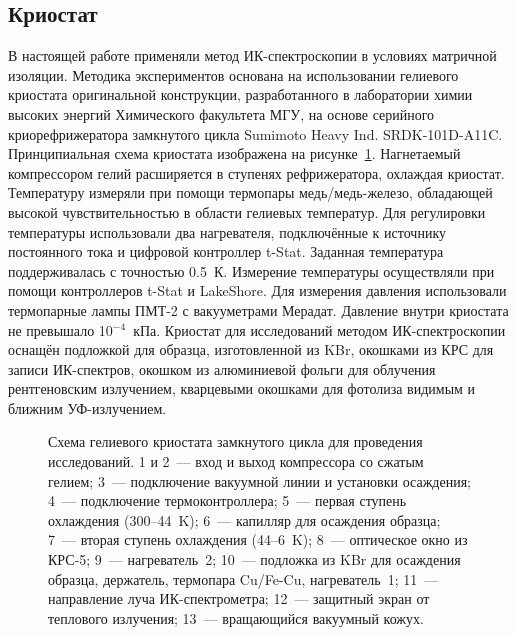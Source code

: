 \subsection{Криостат}
В настоящей работе применяли метод ИК-спектроскопии в условиях матричной изоляции. 
Методика экспериментов основана на использовании гелиевого криостата оригинальной конструкции, разработанного в лаборатории химии высоких энергий 
Химического факультета МГУ, на основе серийного криорефрижератора замкнутого цикла Sumimoto Heavy Ind. SRDK-101D-A11C. 
Принципиальная схема криостата изображена на рисунке~\ref{IR}.
Нагнетаемый компрессором гелий расширяется в ступенях рефрижератора, охлаждая криостат. 
Температуру измеряли при помощи термопары медь/медь-железо, обладающей высокой чувствительностью в области гелиевых температур. 
Для регулировки температуры использовали два нагревателя, подключённые к источнику постоянного тока и цифровой контроллер t-Stat. 
Заданная температура поддерживалась с точностью 0.5~К. Измерение температуры осуществляли при помощи контроллеров t-Stat и LakeShore. 
Для измерения давления использовали термопарные лампы ПМТ-2 с вакууметрами Мерадат. Давление внутри криостата не превышало 10$^{-4}$~кПа. 
Криостат для исследований методом ИК-спектроскопии оснащён подложкой для образца, изготовленной из KBr, окошками из КРС для записи ИК-спектров, 
окошком из алюминиевой фольги для облучения рентгеновским излучением, кварцевыми окошками для фотолиза видимым и ближним УФ-излучением.
\begin{figure}[H]
\caption{Схема гелиевого криостата замкнутого цикла для проведения исследований. 1 и 2~--- вход и выход компрессора со сжатым гелием; 3~--- подключение вакуумной линии и установки осаждения; 4~--- подключение термоконтроллера; 5~--- первая ступень охлаждения (300--44~K); 6~--- капилляр для осаждения образца; 7~--- вторая ступень охлаждения (44--6~K); 8~--- оптическое окно из КРС-5; 9~--- нагреватель~2; 10~--- подложка из KBr для осаждения образца, держатель, термопара Cu/Fe-Cu, нагреватель~1; 11~--- направление луча ИК-спектрометра; 12~--- защитный экран от теплового излучения; 13~--- вращающийся вакуумный кожух.}
\label{IR}
\end{figure}
